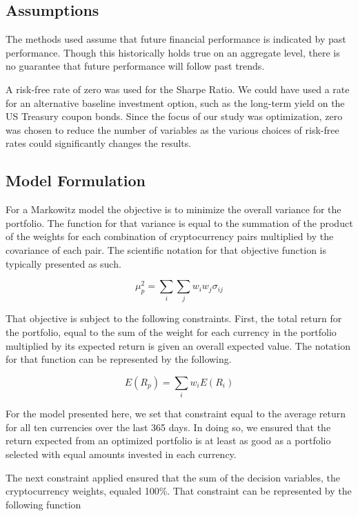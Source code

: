 \documentclass[12pt]{article} %
\begin{document}
\subsection{Assumptions}

The methods used assume that future financial performance is indicated by past performance. Though this historically holds true on an aggregate level, there is no guarantee that future performance will follow past trends. 

A risk-free rate of zero was used for the Sharpe Ratio. We could have used a rate for an alternative baseline investment option, such as the long-term yield on the US Treasury coupon bonds. Since the focus of our study was optimization, zero was chosen to reduce the number of variables as the various choices of risk-free rates could significantly changes the results.

\subsection{Model Formulation}

For a Markowitz model the objective is to minimize the overall variance for the portfolio.  The function for that variance is equal to the summation of the product of the weights for each combination of cryptocurrency pairs multiplied by the covariance of each pair.  The scientific notation for that objective function is typically presented as such. 

\begin{equation} 
\mu_p^2  = \sum_i \sum_j w_i w_j \sigma_{ij}
\end{equation}

That objective is subject to the following constraints.  First, the total return for the portfolio, equal to the sum of the weight for each currency in the portfolio multiplied by its expected return is given an overall expected value.  The notation for that function can be represented by the following.

\begin{equation} 
E(R_p) = \sum_i w_i E(R_i)
\end{equation}
 
For the model presented here, we set that constraint equal to the average return for all ten currencies over the last 365 days. In doing so, we ensured that the return expected from an optimized portfolio is at least as good as a portfolio selected with equal amounts invested in each currency.
 
The next constraint applied ensured that the sum of the decision variables, the cryptocurrency weights, equaled 100\%.  That constraint can be represented by the following function
\end{document}
